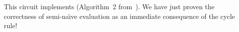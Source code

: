 This circuit implements 
(Algorithm~2 from~\cite{greco-sldm15}).  We have just proven the
correctness of semi-na\"{\i}ve evaluation as an immediate consequence
of the cycle rule!

